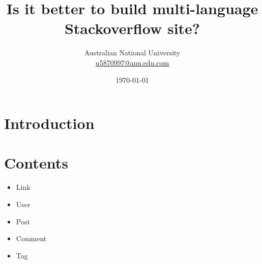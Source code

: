 \documentclass[A4paper,twoside,twocolumn]{article}
\title{Is it better to build multi-language Stackoverflow site?} %
\author{%
\normalsize Australian National University \\ %
\normalsize \href{mailto:u5870997@anu.edu.com}{u5870997@anu.edu.com} %
}
\date{\today} %
\begin{document}
\maketitle


\section{Introduction}



\section{Contents}

\begin{itemize}
\item Link
\item User
\item Post
\item Comment
\item Tag
\end{itemize}

\end{document}
